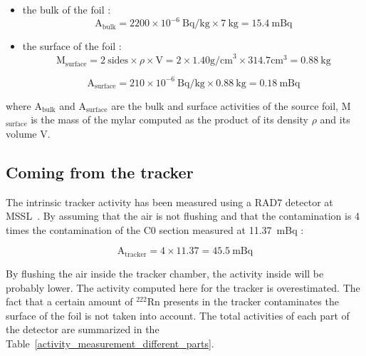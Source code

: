 \documentclass[main.tex]{subfiles}
\begin{document}
\begin{itemize}
\item the bulk of the foil :
\begin{equation}
\text{A}_{\text{bulk}} =  \text{2200} \times \text{10}^{-\text{6}}~ \text{Bq/kg} \times \text{7}~\text{kg} = \text{15.4}~\text{mBq} 
\end{equation}

\item the surface of the foil :
\begin{equation}
\text{M}_{\text{surface}} = \text{2}~\text{sides} \times \rho \times \text{V} = \text{2} \times \text{1.40} \text{g/cm}^\text{3} \times \text{314.7} \text{cm}^\text{3} = \text{0.88}~\text{kg}
\end{equation}

\begin{equation}
\text{A}_{\text{surface}} = \text{210} \times \text{10}^{-\text{6}}~\text{Bq/kg} \times \text{0.88}~\text{kg} = \text{0.18}~\text{mBq} 
\end{equation}
\end{itemize}


\NI where A$_{\text{bulk}}$ and A$_{\text{surface}}$ are the bulk and surface activities of the source foil, M$_{\text{surface}}$ is the mass of the mylar computed as the product of its density $\rho$ and its volume V.


\subsection{Coming from the tracker}\label{sec:ActivityTracker}


\noindent The intrinsic tracker activity has been measured using a RAD7 detector at MSSL~\cite{RAD7measurement}. By assuming that the air is not flushing and that the contamination is 4 times the contamination of the C0 section measured at 11.37~mBq : 


\begin{equation}
\text{A}_{\text{tracker}} =  \text{4} \times  \text{11.37} = \text{45.5}~\text{mBq} 
\end{equation}


\noindent By flushing the air inside the tracker chamber, the activity inside will be probably lower. The activity computed here for the tracker is overestimated. The fact that a certain amount of $^{222}$Rn presents in the tracker contaminates the surface of the foil is not taken into account. The total activities of each part of the detector are summarized in the Table~\ref{activity_measurement_different_parts}.
\end{document}
